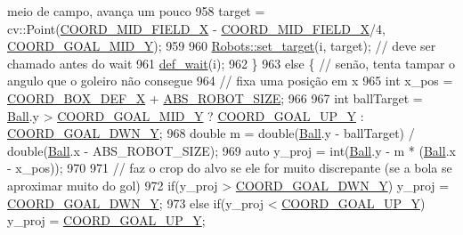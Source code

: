 \begin{DoxyCode}
{       meio de campo, avança um pouco}
958                 target = cv::Point(\hyperlink{namespace_c_o_n_s_t_ad21da2e838c0a8da29db74cba008cf46}{COORD\_MID\_FIELD\_X} - 
      \hyperlink{namespace_c_o_n_s_t_ad21da2e838c0a8da29db74cba008cf46}{COORD\_MID\_FIELD\_X}/4, \hyperlink{namespace_c_o_n_s_t_a227a51bc8809f1391dc096eafb6b1d85}{COORD\_GOAL\_MID\_Y});
959 
960                 \hyperlink{class_robots_ac1cd5c41b6e5d5643b2186ca51699c8f}{Robots::set\_target}(i, target); \textcolor{comment}{// deve ser chamado antes do wait}
961                 \hyperlink{class_strategy_a636339a7d8b809c6bbfb67e0942ae052}{def\_wait}(i);
962             \}
963             \textcolor{keywordflow}{else} \{ \textcolor{comment}{// senão, tenta tampar o angulo que o goleiro não consegue}
964                 \textcolor{comment}{// fixa uma posição em x}
965                 \textcolor{keywordtype}{int} x\_pos = \hyperlink{namespace_c_o_n_s_t_a7d27201b3e7475f3c8141242fa75a026}{COORD\_BOX\_DEF\_X} + \hyperlink{namespace_c_o_n_s_t_a8d0d7fe4341b9129cabd565ef16a0640}{ABS\_ROBOT\_SIZE};
966 
967                 \textcolor{keywordtype}{int} ballTarget = \hyperlink{class_strategy_abd16b6276e747f6cd99a19963ff5495b}{Ball}.y > \hyperlink{namespace_c_o_n_s_t_a227a51bc8809f1391dc096eafb6b1d85}{COORD\_GOAL\_MID\_Y} ? 
      \hyperlink{namespace_c_o_n_s_t_ab1e77f62ff88d04c9aac407f4405add2}{COORD\_GOAL\_UP\_Y} : \hyperlink{namespace_c_o_n_s_t_a97382a534273f1ca10b7cdf29fab9d0a}{COORD\_GOAL\_DWN\_Y};
968                 \textcolor{keywordtype}{double} m = double(\hyperlink{class_strategy_abd16b6276e747f6cd99a19963ff5495b}{Ball}.y - ballTarget) / double(\hyperlink{class_strategy_abd16b6276e747f6cd99a19963ff5495b}{Ball}.x - ABS\_ROBOT\_SIZE);
969                 \textcolor{keyword}{auto} y\_proj = int(\hyperlink{class_strategy_abd16b6276e747f6cd99a19963ff5495b}{Ball}.y - m * (\hyperlink{class_strategy_abd16b6276e747f6cd99a19963ff5495b}{Ball}.x - x\_pos));
970 
971                 \textcolor{comment}{// faz o crop do alvo se ele for muito discrepante (se a bola se aproximar muito do gol)}
972                 \textcolor{keywordflow}{if}(y\_proj > \hyperlink{namespace_c_o_n_s_t_a97382a534273f1ca10b7cdf29fab9d0a}{COORD\_GOAL\_DWN\_Y}) y\_proj = 
      \hyperlink{namespace_c_o_n_s_t_a97382a534273f1ca10b7cdf29fab9d0a}{COORD\_GOAL\_DWN\_Y};
973                 \textcolor{keywordflow}{else} \textcolor{keywordflow}{if}(y\_proj < \hyperlink{namespace_c_o_n_s_t_ab1e77f62ff88d04c9aac407f4405add2}{COORD\_GOAL\_UP\_Y}) y\_proj = 
      \hyperlink{namespace_c_o_n_s_t_ab1e77f62ff88d04c9aac407f4405add2}{COORD\_GOAL\_UP\_Y};

\end{DoxyCode}

